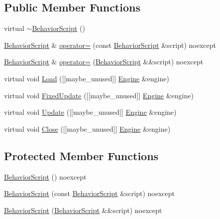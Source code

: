 \subsection*{Public Member Functions}
\begin{DoxyCompactItemize}
\item 
virtual \mbox{\hyperlink{classmage_1_1_behavior_script_a61e4825ba0fc7746d49faa44ed7bc481}{$\sim$\+Behavior\+Script}} ()
\item 
\mbox{\hyperlink{classmage_1_1_behavior_script}{Behavior\+Script}} \& \mbox{\hyperlink{classmage_1_1_behavior_script_adb153676123adadacf023e4f3804abf5}{operator=}} (const \mbox{\hyperlink{classmage_1_1_behavior_script}{Behavior\+Script}} \&script) noexcept
\item 
\mbox{\hyperlink{classmage_1_1_behavior_script}{Behavior\+Script}} \& \mbox{\hyperlink{classmage_1_1_behavior_script_aefeae227ee8d2452bf05782604f5011e}{operator=}} (\mbox{\hyperlink{classmage_1_1_behavior_script}{Behavior\+Script}} \&\&script) noexcept
\item 
virtual void \mbox{\hyperlink{classmage_1_1_behavior_script_ae7864876b2ffb1d1d8d8a56e3099f1f2}{Load}} (\mbox{[}\mbox{[}maybe\+\_\+unused\mbox{]}\mbox{]} \mbox{\hyperlink{classmage_1_1_engine}{Engine}} \&engine)
\item 
virtual void \mbox{\hyperlink{classmage_1_1_behavior_script_ae4b9cb7f3ee9f96d69682aef42f8bb12}{Fixed\+Update}} (\mbox{[}\mbox{[}maybe\+\_\+unused\mbox{]}\mbox{]} \mbox{\hyperlink{classmage_1_1_engine}{Engine}} \&engine)
\item 
virtual void \mbox{\hyperlink{classmage_1_1_behavior_script_a085634661326b59850c1111e537baa4e}{Update}} (\mbox{[}\mbox{[}maybe\+\_\+unused\mbox{]}\mbox{]} \mbox{\hyperlink{classmage_1_1_engine}{Engine}} \&engine)
\item 
virtual void \mbox{\hyperlink{classmage_1_1_behavior_script_a5a8d2d38b369e193bf8cc20a74708397}{Close}} (\mbox{[}\mbox{[}maybe\+\_\+unused\mbox{]}\mbox{]} \mbox{\hyperlink{classmage_1_1_engine}{Engine}} \&engine)
\end{DoxyCompactItemize}
\subsection*{Protected Member Functions}
\begin{DoxyCompactItemize}
\item 
\mbox{\hyperlink{classmage_1_1_behavior_script_adbe64d10ebd511f05af9e0930e245913}{Behavior\+Script}} () noexcept
\item 
\mbox{\hyperlink{classmage_1_1_behavior_script_a0f3baaa9549ab272f0711c06d33ad223}{Behavior\+Script}} (const \mbox{\hyperlink{classmage_1_1_behavior_script}{Behavior\+Script}} \&script) noexcept
\item 
\mbox{\hyperlink{classmage_1_1_behavior_script_abae69e797a05fa2cd1c3b7704f1c6767}{Behavior\+Script}} (\mbox{\hyperlink{classmage_1_1_behavior_script}{Behavior\+Script}} \&\&script) noexcept
\end{DoxyCompactItemize}


